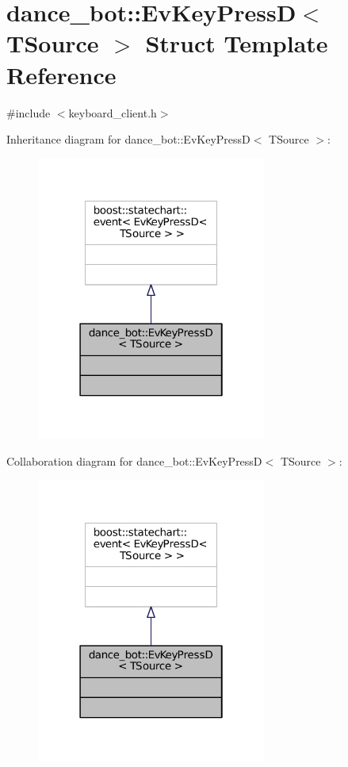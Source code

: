 \hypertarget{structdance__bot_1_1EvKeyPressD}{}\section{dance\+\_\+bot\+:\+:Ev\+Key\+PressD$<$ T\+Source $>$ Struct Template Reference}
\label{structdance__bot_1_1EvKeyPressD}


{\ttfamily \#include $<$keyboard\+\_\+client.\+h$>$}



Inheritance diagram for dance\+\_\+bot\+:\+:Ev\+Key\+PressD$<$ T\+Source $>$\+:
\nopagebreak
\begin{figure}[H]
\begin{center}
\leavevmode
\includegraphics[width=214pt]{structdance__bot_1_1EvKeyPressD__inherit__graph}
\end{center}
\end{figure}


Collaboration diagram for dance\+\_\+bot\+:\+:Ev\+Key\+PressD$<$ T\+Source $>$\+:
\nopagebreak
\begin{figure}[H]
\begin{center}
\leavevmode
\includegraphics[width=214pt]{structdance__bot_1_1EvKeyPressD__coll__graph}
\end{center}
\end{figure}


